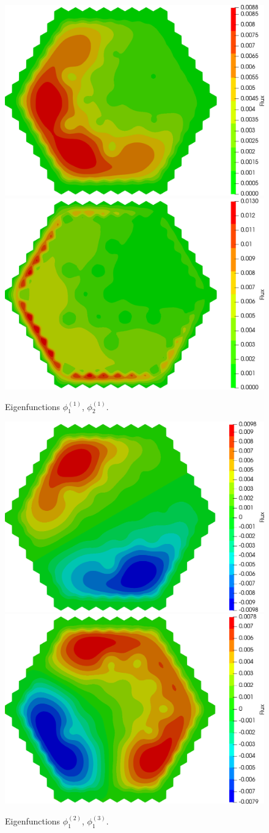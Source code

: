 \documentclass[authoryear]{elsarticle}
\begin{document}
\begin{figure}[H]
\begin{center}
	\includegraphics[width=0.49\linewidth]{iaea_cosym/sp3_alpha_u1_1_assym.png}
	\includegraphics[width=0.49\linewidth]{iaea_cosym/sp3_alpha_u2_1_assym.png}\\
	\caption{Eigenfunctions $\phi_1^{(1)}$, $\phi_2^{(1)}$.}
	\label{fig:iaea_cosym_fun_1}
\end{center}
\end{figure}
\begin{figure}[H]
\begin{center}
	\includegraphics[width=0.49\linewidth]{iaea_cosym/sp3_alpha_u1_2_assym.png}
	\includegraphics[width=0.49\linewidth]{iaea_cosym/sp3_alpha_u1_3_assym.png}\\
	\caption{Eigenfunctions $\phi_1^{(2)}$, $\phi_1^{(3)}$.}
	\label{fig:iaea_cosym_fun_2}
\end{center}
\end{figure}
\end{document}
